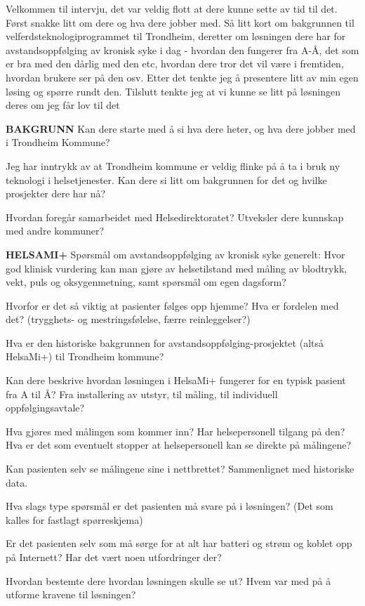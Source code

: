 Velkommen til intervju, det var veldig flott at dere kunne sette av tid til det. Først snakke litt om dere og hva dere jobber med. Så litt kort om bakgrunnen til velferdsteknologiprogrammet til Trondheim, deretter om løsningen dere har for avstandsoppfølging av kronisk syke i dag - hvordan den fungerer fra A-Å, det som er bra med den dårlig med den etc, hvordan dere tror det vil være i fremtiden, hvordan brukere ser på den osv. Etter det tenkte jeg å presentere litt av min egen løsing og spørre rundt den. Tilslutt tenkte jeg at vi kunne se litt på løsningen deres om jeg får lov til det
 
\textbf{BAKGRUNN}
Kan dere starte med å si hva dere heter, og hva dere jobber med i Trondheim Kommune?
 
Jeg har inntrykk av at Trondheim kommune er veldig flinke på å ta i bruk ny teknologi i helsetjenester. Kan dere si litt om bakgrunnen for det og hvilke prosjekter dere har nå?
 
Hvordan foregår samarbeidet med Helsedirektoratet? Utveksler dere kunnskap med andre kommuner?
 
\textbf{HELSAMI+}
Spørsmål om avstandsoppfølging av kronisk syke generelt:
Hvor god klinisk vurdering kan man gjøre av helsetilstand med måling av blodtrykk, vekt, puls og oksygenmetning, samt spørsmål om egen dagsform?
 
Hvorfor er det så viktig at pasienter følges opp hjemme? Hva er fordelen med det? (trygghets- og mestringsfølelse, færre reinleggelser?)
 
Hva er den historiske bakgrunnen for avstandsoppfølging-prosjektet (altså HelsaMi+) til Trondheim kommune? 
 
Kan dere beskrive hvordan løsningen i HelsaMi+ fungerer for en typisk pasient fra A til Å? Fra installering av utstyr, til måling, til individuell oppfølgingsavtale?
 
Hva gjøres med målingen som kommer inn? Har helsepersonell tilgang på den? Hva er det som eventuelt stopper at helsepersonell kan se direkte på målingene?
 
Kan pasienten selv se målingene sine i nettbrettet? Sammenlignet med historiske data.
 
Hva slags type spørsmål er det pasienten må svare på i løsningen? (Det som kalles for fastlagt spørreskjema)
 
Er det pasienten selv som må sørge for at alt har batteri og strøm og koblet opp på Internett? Har det vært noen utfordringer der?
 
Hvordan bestemte dere hvordan løsningen skulle se ut? Hvem var med på å utforme kravene til løsningen? 
 
